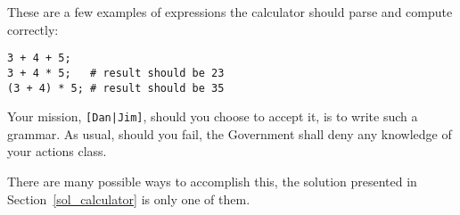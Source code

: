 These are a few examples of expressions the calculator should 
parse and compute correctly:
\begin{verbatim}
3 + 4 + 5;
3 + 4 * 5;   # result should be 23
(3 + 4) * 5; # result should be 35 
\end{verbatim}

\begin{exercise}
Your mission, \verb'[Dan|Jim]', should you choose to accept it, 
is to write such a grammar. As usual, should you fail, the 
Government shall deny any knowledge of your actions class.

There are many possible ways to accomplish this, the solution 
presented in Section~\ref{sol_calculator} is only one of them.
\end{exercise}


